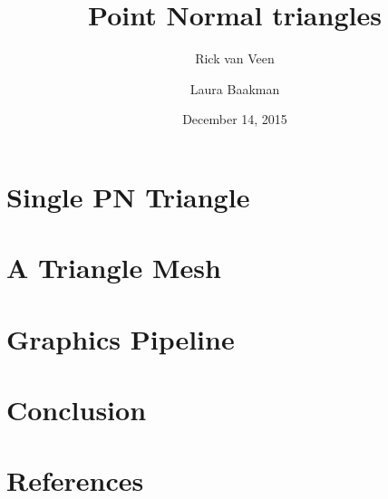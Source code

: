 \documentclass[13pt, final]{beamer}
\title{Point Normal triangles}
\author{Rick van Veen \and Laura Baakman}
\date{December 14, 2015}
\institute{Advanced Computer Graphics}
\begin{document}
	\begin{frame}
		\titlepage
	\end{frame}

	

	\section{Single PN Triangle}
	

	\section{A Triangle Mesh}
	

	\section{Graphics Pipeline}
	

	\section{Conclusion}
	

	\section{References}
	
\end{document}
